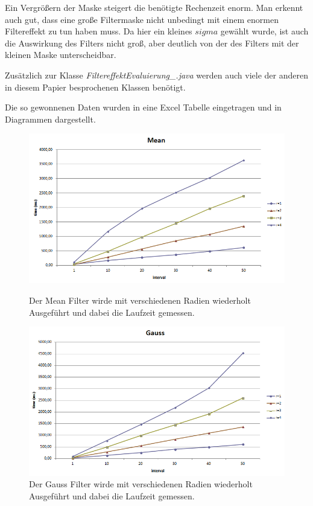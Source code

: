 \documentclass[12pt,german]{article}
\begin{document}
Ein Vergrößern der Maske steigert die benötigte Rechenzeit enorm. Man erkennt auch gut, dass eine große Filtermaske nicht unbedingt mit einem enormen Filtereffekt zu tun haben muss. Da hier ein kleines $sigma$ gewählt wurde, ist auch die Auswirkung des Filters nicht groß, aber deutlich von der des Filters mit der kleinen Maske unterscheidbar.


Zusätzlich zur Klasse \textit{FiltereffektEvaluierung\_.java} werden auch viele der anderen in diesem Papier besprochenen Klassen benötigt.


Die so gewonnenen Daten wurden in eine Excel Tabelle eingetragen und in Diagrammen dargestellt. 
\begin{figure} [H]
  \centering
  \includegraphics[width=12cm]{TimeEvaluationGraph_Mean.png}
  \caption{Der Mean Filter wirde mit verschiedenen Radien wiederholt Ausgeführt und dabei die Laufzeit gemessen.}
  \includegraphics[width=12cm]{TimeEvaluationGraph_Gauss.png}
  \caption{Der Gauss Filter wirde mit verschiedenen Radien wiederholt Ausgeführt und dabei die Laufzeit gemessen.}
\end{figure}
\end{document}
